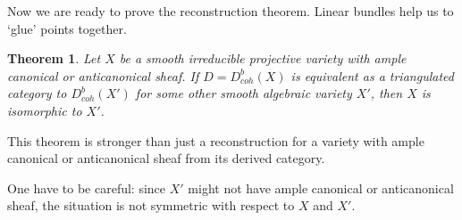 \documentclass[12pt]{article}
\newtheorem{theorem}{Theorem}[section]
\def\db#1{ D^b_{coh}({#1})}
\begin{document}
Now we are ready to prove the reconstruction theorem. Linear bundles help us to `glue' points together.
\begin{theorem}\label{rec}
Let $X$ be a smooth irreducible projective variety with ample canonical or anticanonical sheaf. If $D=\db{X}$ is equivalent
  as a triangulated category to $\db{X'}$ for some other smooth algebraic variety $X'$, then $X$ is isomorphic to $X'$.
\end{theorem}
This theorem is stronger than just a reconstruction for a variety with ample canonical or anticanonical sheaf from its derived category.

One have to be careful: since $X'$ might not have ample canonical or anticanonical sheaf, the situation is not symmetric with respect to $X$ and $X'$.
\end{document}

